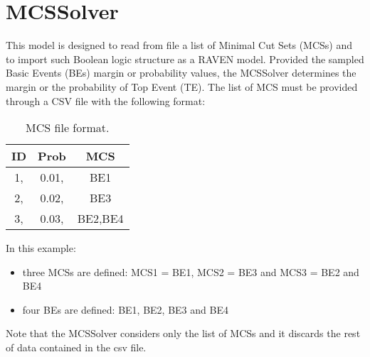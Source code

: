 \section{MCSSolver}
\label{sec:MCSSolver}

This model is designed to read from file a list of Minimal Cut Sets (MCSs) and to import such Boolean logic structure as a RAVEN model.
Provided the sampled Basic Events (BEs) margin or probability values, the MCSSolver determines the margin or the probability
of Top Event (TE).
The list of MCS must be provided through a CSV file with the following format:

\begin{table}
  \begin{center}
    \caption{MCS file format.}
    \label{tab:table1}
    \begin{tabular}{c|c|c}
      \textbf{ID} & \textbf{Prob} & \textbf{MCS}\\
      \hline
      1, & 0.01, & BE1\\
      2, & 0.02, & BE3\\
      3, & 0.03, & BE2,BE4\\
    \end{tabular}
  \end{center}
\end{table}

In this example:
\begin{itemize}
  \item three MCSs are defined: MCS1 = BE1, MCS2 = BE3 and MCS3 = BE2 and BE4
  \item four BEs are defined: BE1, BE2, BE3 and BE4
\end{itemize}

Note that the MCSSolver considers only the list of MCSs and it discards the rest of data contained in the csv file.

